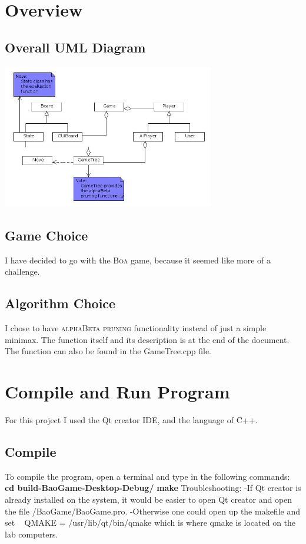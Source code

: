 \documentclass[a4paper]{article}
\begin{document}

\tableofcontents
\newpage

\section{Overview}
	\subsection{Overall UML Diagram}
		\begin{center}
			\includegraphics[width=350px]{fullUML.jpg}	
		\end{center}
	
	\subsection{Game Choice}
	I have decided to go with the \textsc{\LARGE Boa} game, because it seemed like more of a challenge.
	\subsection{Algorithm Choice}
	I chose to have \textsc{\LARGE alphaBeta pruning} functionality instead of just a simple minimax. The function itself and its 
	description is at the end of the document. The function can also be found in the GameTree.cpp file.
\section{Compile and Run Program}
For this project I used the Qt creator IDE, and the language of C++.
	\subsection{Compile}
	To compile the program, open a terminal and type in the following commands:
	\newline
	\newline
	\textbf{cd build-BaoGame-Desktop-Debug/} \newline
	\textbf{make} 
	\newline
	\newline
	Troubleshooting:\newline
	-If Qt creator is already installed on the system, it would be easier
		to open Qt creator and open the file /BaoGame/BaoGame.pro.
	-Otherwise one could open up the makefile and set \newline\
	\newline
	QMAKE = /usr/lib/qt/bin/qmake \newline
	\newline	
	which is where qmake is located on the lab computers.
	
\end{document}

